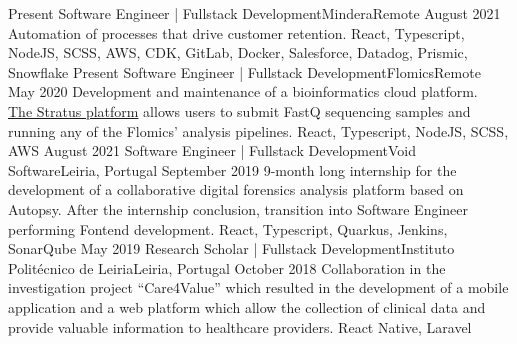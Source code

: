 %
%
%
\begin{experiences}
  \experience
    {Present}   {Software Engineer | Fullstack Development}{Mindera}{Remote}
    {August 2021} {Automation of processes that drive customer retention.}
                  {React, Typescript, NodeJS, SCSS, AWS, CDK, GitLab, Docker, Salesforce, Datadog, Prismic, Snowflake}
  \emptySeparator
  \experience
    {Present} {Software Engineer | Fullstack Development}{Flomics}{Remote}
    {May 2020}    {Development and maintenance of a bioinformatics cloud platform.\\
                  \href{https://cloud.flomics.com}{The Stratus platform} allows users to submit FastQ sequencing samples and running any of the Flomics' analysis pipelines.}
                  {React, Typescript, NodeJS, SCSS, AWS}
  \emptySeparator
  \experience
    {August 2021}     {Software Engineer | Fullstack Development}{Void Software}{Leiria, Portugal}
    {September 2019}    {9-month long internship for the development of a collaborative digital forensics analysis
                          platform based on Autopsy.
                          After the internship conclusion, transition into Software Engineer
                          performing Fontend development.}
                  {React, Typescript, Quarkus, Jenkins, SonarQube}
  \emptySeparator
  \emptySeparator
  \experience
    {May 2019}     {Research Scholar | Fullstack Development}{Instituto Politécnico de Leiria}{Leiria, Portugal}
    {October 2018}    {Collaboration in the investigation project “Care4Value” which resulted in
                        the development of a mobile application and a web platform which allow
                        the collection of clinical data and provide valuable information to
                        healthcare providers.}
                    {React Native, Laravel}
  \emptySeparator
\end{experiences}
